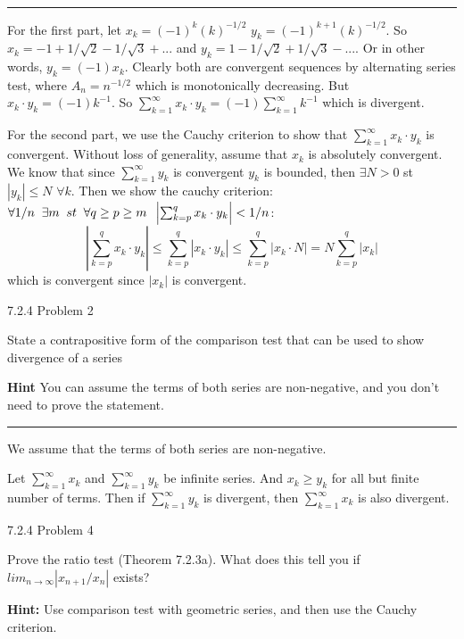 \documentclass[11pt]{article}
\begin{document}
\hrule

For the first part, let $x_k = (-1)^k (k)^{-1/2}$ $y_k = (-1)^{k+1} (k)^{-1/2}$.
So $x_k = -1 + 1/\sqrt{2} - 1/\sqrt{3} + ...$ and $y_k = 1 - 1/\sqrt{2} + 1/\sqrt{3} - ...$.
Or in other words, $y_k = (-1) x_k$. Clearly both are convergent sequences by alternating series test,
where $A_n = n^{-1/2}$ which is monotonically decreasing. But $x_k \cdot y_k = (-1) k^{-1}$. So
$\sum_{k = 1} ^\infty x_k \cdot y_k = (-1) \sum_{k = 1} ^\infty k^{-1}$ which is divergent.


For the second part, we use the Cauchy criterion to show that $\sum_{k = 1} ^\infty x_k \cdot y_k$ is convergent.
Without loss of generality, assume that $x_k$ is absolutely convergent. We know that since $\sum_{k = 1} ^\infty y_k$ is convergent $y_k$ is bounded,
then $\exists N > 0$ st $|y_k| \leq N$ $\forall k$. Then we show the cauchy criterion: $\forall 1/n \sp \exists m \sp st \sp \forall q \geq p \geq m \sp \left| \sum_{k = p} ^q x_k \cdot y_k \right| < 1/n$: 
$$ \left| \sum_{k = p} ^q x_k \cdot y_k \right| \leq  \sum_{k = p} ^q \left| x_k \cdot y_k \right| \leq \sum_{k = p} ^q \left| x_k \cdot N \right| = N \sum_{k = p} ^q \left| x_k \right|$$
which is convergent since $|x_k|$ is convergent.






 7.2.4 Problem 2

State a contrapositive form of the comparison test that can be used to show divergence of a series

\textbf{Hint} You can assume the terms of both series are non-negative, and you don't need to prove the statement.


\hrule

We assume that the terms of both series are non-negative. 

Let $\sum_{k=1} ^\infty x_k$ and $\sum_{k=1} ^\infty y_k$ be infinite series. And $x_k \geq y_k$ for all but finite number of terms.
Then if $\sum_{k=1} ^\infty y_k$ is divergent, then $\sum_{k=1} ^\infty x_k$ is also divergent.





 7.2.4 Problem 4

Prove the ratio test (Theorem 7.2.3a). What does this tell you if $lim_{n \to \infty} |x_{n+1} / x_n|$ exists?

\textbf{Hint: } Use comparison test with geometric series, and then use the Cauchy criterion.
\end{document}
